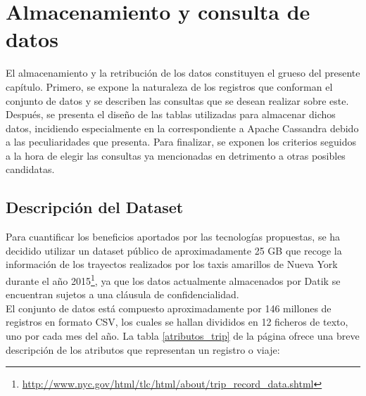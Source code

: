 
\pagestyle{fancy}

\chapter{Almacenamiento y consulta de datos}
\label{almacenamiento_datos}

El almacenamiento y la retribución de los datos constituyen el grueso del presente capítulo. Primero, se expone la naturaleza de los registros que conforman el conjunto de datos y se describen las consultas que se desean realizar sobre este. Después, se presenta el diseño de las tablas utilizadas para almacenar dichos datos, incidiendo especialmente en la correspondiente a Apache Cassandra debido a las peculiaridades que presenta. Para finalizar, se exponen los criterios seguidos a la hora de elegir las consultas ya mencionadas en detrimento a otras posibles candidatas.

\section{Descripción del Dataset}

Para cuantificar los beneficios aportados por las tecnologías propuestas, se ha decidido utilizar un dataset público de aproximadamente 25 GB que recoge la información de los trayectos realizados por los taxis amarillos de Nueva York durante el año 2015\footnote{\url{http://www.nyc.gov/html/tlc/html/about/trip_record_data.shtml}}, ya que los datos actualmente almacenados por Datik se encuentran sujetos a una cláusula de confidencialidad.\\

El conjunto de datos está compuesto aproximadamente por 146 millones de registros en formato CSV, los cuales se hallan divididos en 12 ficheros de texto, uno por cada mes del año. La tabla \ref{atributos_trip} de la página \pageref{atributos_trip} ofrece una breve descripción de los atributos que representan un registro o viaje: 

